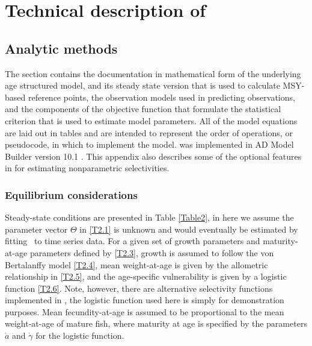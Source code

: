 \section{Technical description of \iscam}\label{appiSCAM}
	\subsection{Analytic methods}
	The section contains the documentation in mathematical form of the underlying age structured model, and its steady state version that is used to calculate MSY-based reference points, the observation models used in predicting observations, and the components of the objective function that formulate the statistical criterion that is used to estimate model parameters. All of the model equations are laid out in tables and are intended to represent the order of operations, or pseudocode, in which to implement the model. \iscam was implemented in AD Model Builder version 10.1 \cite{ADMB2009}.  This appendix also describes some of the optional features in \iscam for estimating nonparametric selectivities.

\subsubsection{Equilibrium considerations}

Steady-state conditions are presented in Table \ref{Table2}, in here we assume the parameter vector $\Theta$ in \eqref{T2.1} is unknown and would eventually be estimated by fitting \iscam\ to time series data.  For a given set of growth parameters and maturity-at-age parameters defined by \eqref{T2.3}, growth is assumed to follow the von Bertalanffy model \eqref{T2.4}, mean weight-at-age is given by the allometric relationship in \eqref{T2.5}, and the age-specific vulnerability is given by a logistic function \eqref{T2.6}.  Note, however, there are alternative selectivity functions implemented in \iscam, the logistic function used here is simply for demonstration purposes.  Mean fecundity-at-age is assumed to be proportional to the mean weight-at-age of mature fish, where maturity at age is specified by the parameters $\dot{a}$ and $\dot{\gamma}$ for the logistic function.

